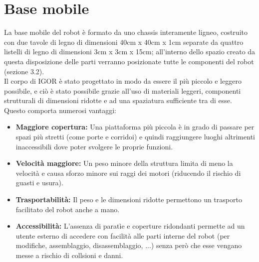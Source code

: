 \documentclass[Lau]{sapthesis}
\begin{document}
\section{Base mobile}
La base mobile del robot è formato da uno chassis interamente ligneo, costruito con due tavole di legno di dimensioni 40cm x 40cm x 1cm separate da quattro listelli di legno di dimensioni 3cm x 3cm x 15cm; all'interno dello spazio creato da questa disposizione delle parti verranno posizionate tutte le componenti del robot (sezione 3.2).\\
Il corpo di \textcolor{sapred}{IGOR} è stato progettato in modo da essere il più piccolo e leggero possibile, e ciò è stato possibile grazie all'uso di materiali leggeri, componenti strutturali di dimensioni ridotte e ad una spaziatura sufficiente tra di esse. Questo comporta numerosi vantaggi:
\begin{itemize}
\item \textbf{Maggiore copertura: } Una piattaforma più piccola è in grado di passare per spazi più stretti (come porte e corridoi) e quindi raggiungere luoghi altrimenti inaccessibili dove poter svolgere le proprie funzioni.
\item \textbf{Velocità maggiore: } Un peso minore della struttura limita di meno la velocità e causa sforzo minore sui raggi dei motori (riducendo il rischio di guasti e usura).
\item \textbf{Trasportabilità: } Il peso e le dimensioni ridotte permettono un trasporto facilitato del robot anche a mano.
\item \textbf{Accessibilità: } L'assenza di paratìe e coperture ridondanti permette ad un utente esterno di accedere con facilità alle parti interne del robot (per modifiche, assemblaggio, disassemblaggio, ...) senza però che esse vengano messe a rischio di collsioni e danni.
\end{itemize}
\end{document}
